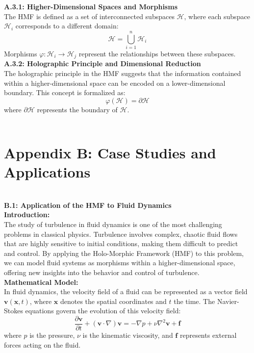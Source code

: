 \documentclass{article}
\begin{document}
\textbf{A.3.1: Higher-Dimensional Spaces and Morphisms}
\\

The HMF is defined as a set of interconnected subspaces \( \mathcal{H} \), where each subspace \( \mathcal{H}_i \) corresponds to a different domain:
\[
\mathcal{H} = \bigcup_{i=1}^{n} \mathcal{H}_i
\]
Morphisms \( \varphi: \mathcal{H}_i \to \mathcal{H}_j \) represent the relationships between these subspaces.
\\

\textbf{A.3.2: Holographic Principle and Dimensional Reduction}
\\

The holographic principle in the HMF suggests that the information contained within a higher-dimensional space can be encoded on a lower-dimensional boundary. This concept is formalized as:
\[
\varphi(\mathcal{H}) = \partial \mathcal{H}
\]
where \( \partial \mathcal{H} \) represents the boundary of \( \mathcal{H} \).
\\
\\

\section*{Appendix B: Case Studies and Applications}
\\

\textbf{B.1: Application of the HMF to Fluid Dynamics}
\\

\textbf{Introduction:}
\\

The study of turbulence in fluid dynamics is one of the most challenging problems in classical physics. Turbulence involves complex, chaotic fluid flows that are highly sensitive to initial conditions, making them difficult to predict and control. By applying the Holo-Morphic Framework (HMF) to this problem, we can model fluid systems as morphisms within a higher-dimensional space, offering new insights into the behavior and control of turbulence.
\\

\textbf{Mathematical Model:}
\\

In fluid dynamics, the velocity field of a fluid can be represented as a vector field \( \mathbf{v}(\mathbf{x}, t) \), where \( \mathbf{x} \) denotes the spatial coordinates and \( t \) the time. The Navier-Stokes equations govern the evolution of this velocity field:
\[
\frac{\partial \mathbf{v}}{\partial t} + (\mathbf{v} \cdot \nabla) \mathbf{v} = -\nabla p + \nu \nabla^2 \mathbf{v} + \mathbf{f}
\]
where \( p \) is the pressure, \( \nu \) is the kinematic viscosity, and \( \mathbf{f} \) represents external forces acting on the fluid.
\end{document}
